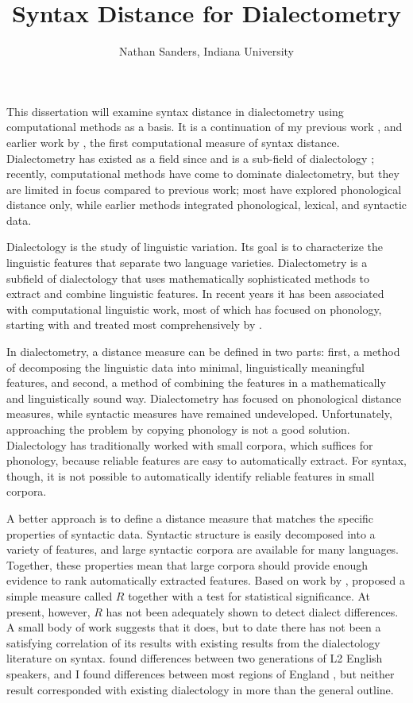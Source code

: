 \documentclass[11pt,letterpaper]{article}
\author{Nathan Sanders, Indiana University}
\title{Syntax Distance for Dialectometry}
\begin{document}
\maketitle

This dissertation will examine syntax distance in dialectometry using
computational methods as a basis. It is a continuation of my previous
work \cite{sanders07}, \cite{sanders08b} and earlier work by
, the first computational measure of syntax
distance. Dialectometry has existed as a field since
 and is a sub-field of dialectology
\cite{chambers98}; recently, computational methods have come to
dominate dialectometry, but they are limited in focus compared to
previous work; most have explored phonological distance only, while
earlier methods integrated phonological, lexical, and syntactic data.

Dialectology is the study of linguistic variation.
Its goal is to characterize the linguistic features that separate two
language varieties. Dialectometry is a subfield of dialectology that
uses mathematically sophisticated methods to extract and combine
linguistic features. In recent years it has been associated with
computational linguistic work, most of which has focused on
phonology, starting with  and treated most
comprehensively by .

In dialectometry, a distance measure can be defined in two parts:
first, a method of decomposing the linguistic data into minimal,
linguistically meaningful features, and second, a method of combining
the features in a mathematically and linguistically sound way.
Dialectometry has focused on phonological distance measures, while
syntactic measures have remained undeveloped. Unfortunately,
approaching the problem by copying phonology is not a good solution.
Dialectology has traditionally worked with small corpora, which
suffices for phonology, because reliable features are easy to
automatically extract. For syntax, though, it is not possible to automatically
identify reliable features in small corpora.

A better approach is to define a distance measure that matches the specific
properties of syntactic data. Syntactic structure is easily decomposed
into a variety of features, and large syntactic corpora are available
for many languages. Together, these properties mean that large corpora
should provide enough evidence to rank automatically extracted
features. Based on work by , 
proposed a simple measure called $R$ together with a test for
statistical significance. At present, however, $R$ has not been
adequately shown to detect dialect differences. A small body of work
suggests that it does, but to date there has not been a satisfying
correlation of its results with existing results from the dialectology
literature on syntax.  found
differences between two generations of L2 English speakers, and I
found differences between most regions of England
\cite{sanders08b}, but neither result corresponded with
existing dialectology in more than the general outline.
\end{document}
